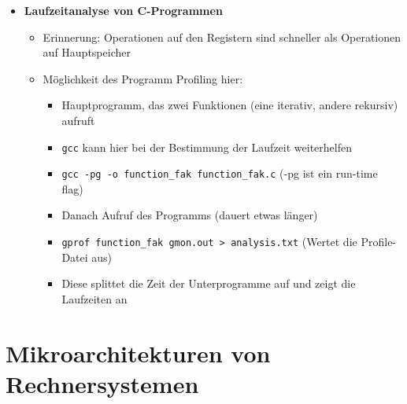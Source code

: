\begin{itemize}
        \item \textbf{Laufzeitanalyse von C-Programmen}
            \begin{itemize}
                \item Erinnerung: Operationen auf den Registern sind schneller als Operationen auf Hauptspeicher
                \item Möglichkeit des Programm Profiling hier:
                    \begin{itemize}
                        \item Hauptprogramm, das zwei Funktionen (eine iterativ, andere rekursiv) aufruft
                        \item \texttt{gcc} kann hier bei der Bestimmung der Laufzeit weiterhelfen
                        \item \texttt{gcc -pg -o function\_fak function\_fak.c} (-pg ist ein run-time flag)
                        \item Danach Aufruf des Programms (dauert etwas länger)
                        \item \texttt{gprof function\_fak gmon.out > analysis.txt} (Wertet die Profile-Datei aus)
                        \item Diese splittet die Zeit der Unterprogramme auf und zeigt die Laufzeiten an
                    \end{itemize}
            \end{itemize}
    \end{itemize}

\pagebreak

\section{Mikroarchitekturen von Rechnersystemen}
